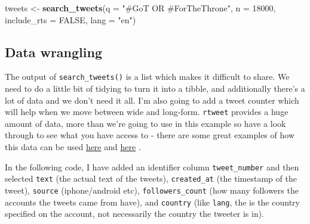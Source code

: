 \documentclass[]{book}
\newenvironment{Shaded}{\begin{snugshade}}{\end{snugshade}}
\newcommand{\DataTypeTok}[1]{\textcolor[rgb]{0.13,0.29,0.53}{#1}}
\newcommand{\DecValTok}[1]{\textcolor[rgb]{0.00,0.00,0.81}{#1}}
\newcommand{\KeywordTok}[1]{\textcolor[rgb]{0.13,0.29,0.53}{\textbf{#1}}}
\newcommand{\NormalTok}[1]{#1}
\newcommand{\OperatorTok}[1]{\textcolor[rgb]{0.81,0.36,0.00}{\textbf{#1}}}
\newcommand{\OtherTok}[1]{\textcolor[rgb]{0.56,0.35,0.01}{#1}}
\newcommand{\StringTok}[1]{\textcolor[rgb]{0.31,0.60,0.02}{#1}}
\begin{document}
\begin{Shaded}
\begin{Highlighting}[]
\NormalTok{tweets <-}\StringTok{ }\KeywordTok{search_tweets}\NormalTok{(}\DataTypeTok{q =} \StringTok{"#GoT OR #ForTheThrone"}\NormalTok{, }\DataTypeTok{n =} \DecValTok{18000}\NormalTok{, }\DataTypeTok{include_rts =} \OtherTok{FALSE}\NormalTok{, }\DataTypeTok{lang =} \StringTok{"en"}\NormalTok{)}
\end{Highlighting}
\end{Shaded}

\hypertarget{data-wrangling}{%
\subsection{Data wrangling}\label{data-wrangling}}

The output of \texttt{search\_tweets()} is a list which makes it difficult to share. We need to do a little bit of tidying to turn it into a tibble, and additionally there's a lot of data and we don't need it all. I'm also going to add a tweet counter which will help when we move between wide and long-form. \texttt{rtweet} provides a huge amount of data, more than we're going to use in this example so have a look through to see what you have access to - there are some great examples of how this data can be used \href{https://mkearney.github.io/nicar_tworkshop/}{here} and \href{https://rud.is/books/21-recipes/index.html}{here} .

In the following code, I have added an identifier column \texttt{tweet\_number} and then selected \texttt{text} (the actual text of the tweets), \texttt{created\_at} (the timestamp of the tweet), \texttt{source} (iphone/android etc), \texttt{followers\_count} (how many followers the accounts the tweets came from have), and \texttt{country} (like \texttt{lang}, the is the country specified on the account, not necessarily the country the tweeter is in).

\begin{Shaded}
\end{Shaded}
\end{document}
